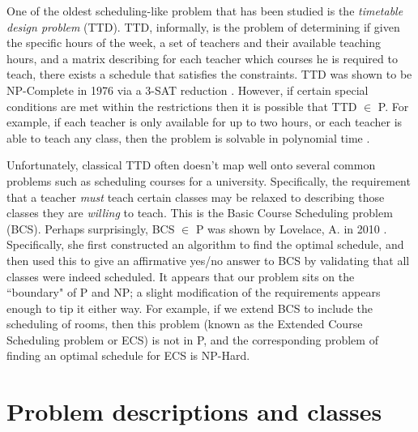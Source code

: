 \documentclass{svjour3}                     %
\begin{document}
One of the oldest scheduling-like problem that has been studied is the \emph{timetable design problem} (TTD). TTD, informally, is the problem of determining if given the specific hours of the week, a set of teachers and their available teaching hours, and a matrix describing for each teacher which courses he is required to teach, there exists a schedule that satisfies the constraints. TTD was shown to be NP-Complete in 1976 via a 3-SAT reduction \cite{even76}. However, if certain special conditions are met within the restrictions then it is possible that TTD $\in$ P. For example, if each teacher is only available for up to two hours, or each teacher is able to teach any class, then the problem is solvable in polynomial time \cite{garey76}.

Unfortunately, classical TTD often doesn't map well onto several common problems such as scheduling courses for a university. Specifically, the requirement that a teacher \emph{must} teach certain classes may be relaxed to describing those classes they are \emph{willing} to teach. This is the Basic Course Scheduling problem (BCS). Perhaps surprisingly, BCS $\in$ P was shown by Lovelace, A. in 2010 \cite{lovelace2010}. Specifically, she first constructed an algorithm to find the optimal schedule, and then used this to give an affirmative yes/no answer to BCS by validating that all classes were indeed scheduled. It appears that our problem sits on the ``boundary" of P and NP; a slight modification of the requirements appears enough to tip it either way. For example, if we extend BCS to include the scheduling of rooms, then this problem (known as the Extended Course Scheduling problem or ECS) is not in P, and the corresponding problem of finding an optimal schedule for ECS is NP-Hard.

\section{Problem descriptions and classes}
\end{document}
